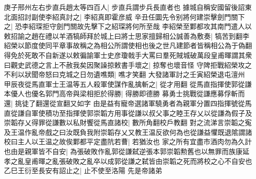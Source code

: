 庚子邢州左右步直兵趙太等四百人|{
	步直兵謂步兵長直者也}
據城自稱安國留後詔東北面招討副使李紹真討之|{
	李紹真即霍彦威}
辛丑任圜先令别將何建崇擊劍門關下之|{
	恐李紹琛拒守劍門關故先擊下之紹琛將何所至哉}
李紹榮至鄴都攻其南門遣人以敕招諭之趙在禮以羊酒犒師拜於城上曰將士思家擅歸相公誠善為敷奏|{
	犒苦到翻李紹榮以節度使同平章事故稱之為相公所謂使相也後之世凡建節者皆稱相公為于偽翻}
得免於死敢不自新遂以敕徧諭軍士史彦瓊戟手大罵曰羣死賊城破萬段皇甫暉謂其衆曰觀史武德之言上不赦我矣因聚譟掠敕書手壞之|{
	掠奪也壞音怪}
守陴拒戰紹榮攻之不利以狀聞帝怒曰克城之日勿遺噍類|{
	噍才笑翻}
大發諸軍討之壬寅紹榮退屯澶州　甲辰夜從馬直軍士王温等五人殺軍使謀作亂擒斬之|{
	從才用翻}
從馬直指揮使郭從謙本優人也優名郭門高帝與梁相拒於得勝|{
	得勝即德勝}
募勇士挑戰從謙應募俘斬而還|{
	挑徒了翻還從宣翻又如字}
由是益有寵帝選諸軍驍勇者為親軍分置四指揮號從馬直從謙自軍使積功至指揮使郭崇韜方用事從謙以叔父事之睦王存乂以從謙為假子及崇韜存乂得罪從謙數以私財饗從馬直諸校|{
	數所角翻校戶教翻}
對之流涕言崇韜之寃及王温作亂帝戲之曰汝既負我附崇韜存乂又教王温反欲何為也從謙益懼既退隂謂諸校曰主人以王温之故俟鄴都平定盡阬若曹|{
	若猶汝也}
家之所有宜盡市酒肉勿為久計也由是親軍皆不自安|{
	為張破敗作亂郭從謙弑逆張本郭崇韜勲舊也以無罪而族康延孝之亂皇甫暉之亂張破敗之亂卒以成郭從謙之弑皆由崇韜之死而將校之心不自安也}
乙巳王衍至長安有詔止之|{
	止不使至洛陽}
先是帝諸弟

